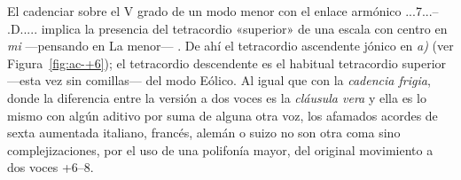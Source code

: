 \documentclass[a4paper,10pt]{article}
\begin{document}
\begin{multicols}{2}
El cadenciar sobre el V grado de un modo menor con el enlace armónico \acorde.\DD..7...-- \acorde.D..... implica la presencia del tetracordio «superior» de una escala con centro en \emph{mi} ---pensando en La menor--- . De ahí el tetracordio ascendente jónico en \emph{a)} (ver Figura~\ref{fig:ac-+6}); el tetracordio descendente  es el habitual tetracordio superior ---esta vez sin comillas--- del modo Eólico. Al igual que con la \emph{cadencia frigia}, donde la diferencia entre la versión a dos voces es la \emph{cláusula vera} y ella es lo mismo con algún aditivo por suma de alguna otra voz, los afamados acordes de sexta aumentada italiano, francés, alemán o suizo no son otra coma sino complejizaciones, por el uso de una polifonía mayor, del original movimiento a dos voces +6--8.
\end{multicols}
\end{document}
